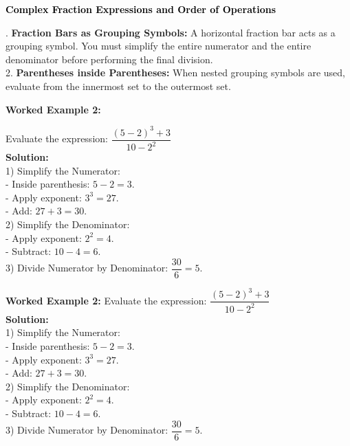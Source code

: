 \documentclass[12pt, letterpaper, fleqn]{article}
\begin{document}
\begin{tcolorbox}[colback=black!10]
    \large\textcolor{black}{\textbf{Complex Fraction Expressions and Order of Operations}}
\end{tcolorbox}

\vspace{3mm}

. \textbf{Fraction Bars as Grouping Symbols:} A horizontal fraction bar acts as a grouping symbol. You must simplify the entire numerator and the entire denominator before performing the final division. \\
2. \textbf{Parentheses inside Parentheses:} When nested grouping symbols are used, evaluate from the innermost set to the outermost set.

\vspace{4mm}

\begin{tcolorbox}[colback=white, colframe=black!25, boxrule=0.6pt, arc=4mm, left=6mm, right=6mm, top=5mm, bottom=5mm]
\textbf{Worked Example 2:}

\medskip
\noindent
Evaluate the expression: $\dfrac{(5 - 2)^3 + 3}{10 - 2^2}$\\
\textbf{Solution:} \\
1) Simplify the Numerator: \\
- Inside parenthesis: $5 - 2 = 3$. \\
- Apply exponent: $3^3 = 27$. \\
- Add: $27 + 3 = 30$. \\
2) Simplify the Denominator: \\
- Apply exponent: $2^2 = 4$. \\
- Subtract: $10 - 4 = 6$. \\
3) Divide Numerator by Denominator: $\dfrac{30}{6} = 5$.
\end{tcolorbox}

\begin{tcolorbox}[colback=white, colframe=black!25, boxrule=0.6pt, arc=4mm, left=6mm, right=6mm, top=5mm, bottom=5mm]
\textbf{Worked Example 2:}
\medskip
\noindent
Evaluate the expression: $\dfrac{(5 - 2)^3 + 3}{10 - 2^2}$\\
\textbf{Solution:} \\
1) Simplify the Numerator: \\
- Inside parenthesis: $5 - 2 = 3$. \\
- Apply exponent: $3^3 = 27$. \\
- Add: $27 + 3 = 30$. \\
2) Simplify the Denominator: \\
- Apply exponent: $2^2 = 4$. \\
- Subtract: $10 - 4 = 6$. \\
3) Divide Numerator by Denominator: $\dfrac{30}{6} = 5$.
\end{tcolorbox}
\end{document}
